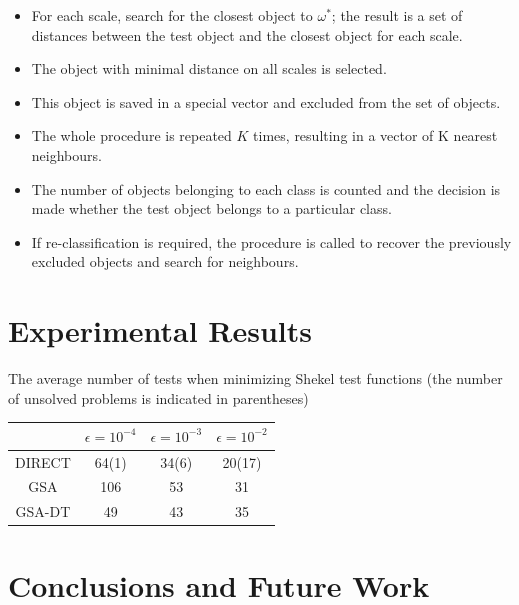 \documentclass[sensors,article,submit,moreauthors,pdftex]{Definitions/mdpi}
\begin{document}
\begin{paracol}{2}
\begin{itemize}
\item For each scale, search for the closest object to $\omega^*$; the result is a set of distances between the test object and the closest object for each scale.
\item The object with minimal distance on all scales is selected.
\item This object is saved in a special vector and excluded from the set of objects.
\item The whole procedure is repeated $K$ times, resulting in a vector of K nearest neighbours.
\item The number of objects belonging to each class is counted and the decision is made whether   the test object belongs to a particular class.
\item If re-classification is required, the procedure is called to recover the previously excluded objects and search for neighbours.
\end{itemize}


\section{Experimental Results}


\begin{specialtable}[H] 
	\caption{The average number of tests when minimizing Shekel test functions (the number of unsolved problems is indicated in parentheses)}\label{table:average_Shekel}
	\center
\begin{tabular}{cccc}
\toprule
        & \textbf{$\epsilon = 10^{-4}$} & \textbf{$\epsilon = 10^{-3}$} & \textbf{$\epsilon = 10^{-2}$} \\
\midrule													
DIRECT         & 64(1) &  34(6)   & 20(17)    \\
GSA            & 106  & 53  &  31   \\ 
GSA-DT         & 49   & 43  &  35   \\

\bottomrule
\end{tabular}
\end{specialtable}






\section{Conclusions and Future Work}



\end{paracol}
\end{document}
